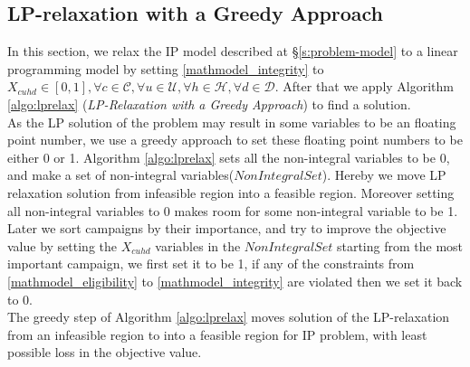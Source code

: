 \documentclass[11pt]{article}
\begin{document}
\subsection{LP-relaxation with a Greedy Approach} \label{s:lp_relaxation_heuristic}
In this section, we relax the IP model described at \S \ref{s:problem-model} to a linear programming model by setting \eqref{mathmodel_integrity} to $X_{{c}{u}{h}{d}} \in [0,1],\forall c \in \mathcal{C}, \forall u \in \mathcal{U}, \forall h \in \mathcal{H}, \forall d \in \mathcal{D}$. After that we apply Algorithm \ref{algo:lprelax} (\textit{LP-Relaxation with a Greedy Approach}) to find a solution.\\ 

As the LP solution of the problem may result in some variables to be an floating point number, we use a greedy approach to set these floating point numbers to be either 0 or 1. Algorithm \ref{algo:lprelax} sets all the non-integral variables to be 0, and make a set of non-integral variables($NonIntegralSet$). Hereby we move LP relaxation solution from infeasible region into a feasible region. Moreover setting all non-integral variables to 0 makes room for some non-integral variable to be 1. Later we sort campaigns by their importance, and try to improve the objective value by setting the $X_{{c}{u}{h}{d}}$ variables in the $NonIntegralSet$ starting from the most important campaign, we first set it to be 1, if any of the constraints from \eqref{mathmodel_eligibility} to \eqref{mathmodel_integrity} are violated then we set it back to 0. \\

The greedy step of Algorithm \ref{algo:lprelax} moves solution of the LP-relaxation from an infeasible region to into a feasible region for IP problem, with least possible loss in the objective value.\\
\end{document}
